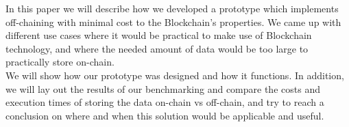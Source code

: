 In this paper we will describe how we developed a prototype which implements off-chaining with minimal cost to the Blockchain’s properties. We came up with different use cases where it would be practical to make use of Blockchain technology, and where the needed amount of data would be too large to practically store on-chain.\\
We will show how our prototype was designed and how it functions. In addition, we will lay out the results of our benchmarking and compare the costs and execution times of storing the data on-chain vs off-chain, and try to reach a conclusion on where and when this solution would be applicable and useful.


\newpage

